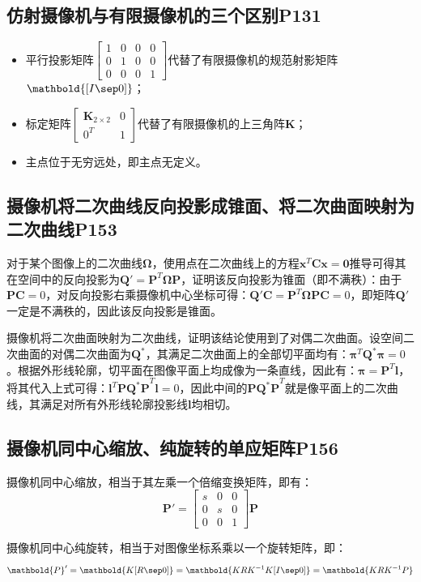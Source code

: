 \documentclass[11pt]{article}
\begin{document}
\subsection{仿射摄像机与有限摄像机的三个区别P131}
\begin{itemize}
  \item 平行投影矩阵$\begin{bmatrix}
            1 & 0 & 0 & 0 \\
            0 & 1 & 0 & 0 \\
            0 & 0 & 0 & 1
          \end{bmatrix}$代替了有限摄像机的规范射影矩阵$\mathbold{[I\sep 0]}$；
  \item 标定矩阵$\begin{bmatrix}
            \mathbold{K}_{2\times2} & 0 \\
            0^T                     & 1
          \end{bmatrix}$代替了有限摄像机的上三角阵$\mathbold{K}$；
  \item 主点位于无穷远处，即主点无定义。
\end{itemize}
\subsection{摄像机将二次曲线反向投影成锥面、将二次曲面映射为二次曲线P153}
对于某个图像上的二次曲线$\mathbold{\Omega}$，使用点在二次曲线上的方程$\mathbf{x^\mathit{T}Cx=0}$推导可得其在空间中的反向投影为$\mathbold{Q}'=\mathbold{P}^T\mathbold{\Omega P}$，证明该反向投影为锥面（即不满秩）：由于$\mathbold{PC}=0$，对反向投影右乘摄像机中心坐标可得：$\mathbold{Q}'\mathbold{C}=\mathbold{P}^T\mathbold{\Omega PC}=0$，即矩阵$\mathbold{Q}'$一定是不满秩的，因此该反向投影是锥面。\par
摄像机将二次曲面映射为二次曲线，证明该结论使用到了对偶二次曲面。设空间二次曲面的对偶二次曲面为$\mathbold{Q}^*$，其满足二次曲面上的全部切平面均有：$\mathbold{\pi}^T\mathbold{Q}^*\mathbold{\pi}=0$。根据外形线轮廓，切平面在图像平面上均成像为一条直线，因此有：$\mathbold{\pi}=\mathbold{P}^T\mathbold{l}$，将其代入上式可得：$\mathbold{l}^T\mathbold{PQ^*P}^T\mathbold{l}=0$，因此中间的$\mathbold{PQ^*P}^T$就是像平面上的二次曲线，其满足对所有外形线轮廓投影线$\mathbold{l}$均相切。
\subsection{摄像机同中心缩放、纯旋转的单应矩阵P156}
摄像机同中心缩放，相当于其左乘一个倍缩变换矩阵，即有：
\begin{equation*}
  \mathbold{P}'=\begin{bmatrix}
    s & 0 & 0 \\
    0 & s & 0 \\
    0 & 0 & 1
  \end{bmatrix}\mathbold{P}
\end{equation*}\par
摄像机同中心纯旋转，相当于对图像坐标系乘以一个旋转矩阵，即：
\begin{equation*}
  \mathbold{P}'=\mathbold{K[R\sep 0]}=\mathbold{KRK^{-1}K[I\sep 0]}=\mathbold{KRK^{-1}P}
\end{equation*}\par
\end{document}
